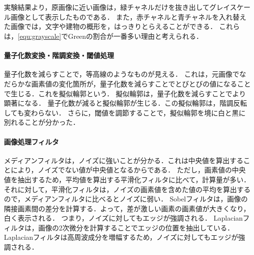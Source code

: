 \section{\consideration}
\paragraph{\kadaiaa}
実験結果より，原画像に近い画像は，緑チャネルだけを抜き出してグレイスケール画像として表示したものである．
また，赤チャネルと青チャネルを入れ替えた画像では，文字や建物の概形を，はっきりとらえることができる．
これらは，\eqref{equ:grayscale}でGreenの割合が一番多い理由と考えられる．
\paragraph{量子化数変換・階調変換・閾値処理}
量子化数を減らすことで，等高線のようなものが見える．
これは，元画像でなだらかな画素値の変化箇所が，量子化数を減らすことでとびとびの値になることで生じる．これを擬似輪郭という．
擬似輪郭は，量子化数を減らすことでより顕著になる．
量子化数が減ると擬似輪郭が生じる．この擬似輪郭は，階調反転しても変わらない．
さらに，閾値を調節することで，擬似輪郭を境に白と黒に別れることが分かった．
\paragraph{画像処理フィルタ}
メディアンフィルタは，ノイズに強いことが分かる．これは中央値を算出することにより，ノイズでない値が中央値となるからである．
ただし，画素値の中央値を抽出するため，平均値を算出する平滑化フィルタに比べて，計算量が多い．
それに対して，平滑化フィルタは，ノイズの画素値を含めた値の平均を算出するので，メディアンフィルタに比べるとノイズに弱い．
Sobelフィルタは，画像の隣接画素間の差分を計算する．よって，差が激しい画素の画素値が大きくなり，白く表示される．
つまり，ノイズに対してもエッジが強調される．
Laplacianフィルタは，画像の2次微分を計算することでエッジの位置を抽出している．Laplacianフィルタは高周波成分を増幅するため，ノイズに対してもエッジが強調される．
